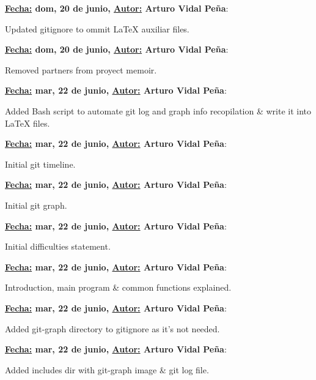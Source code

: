 \item \textbf{\underline{Fecha:} dom, 20 de junio, \underline{Autor:} Arturo Vidal Peña}:\\\item[] Updated gitignore to ommit LaTeX auxiliar files.\\
\item \textbf{\underline{Fecha:} dom, 20 de junio, \underline{Autor:} Arturo Vidal Peña}:\\\item[] Removed partners from proyect memoir.\\
\item \textbf{\underline{Fecha:} mar, 22 de junio, \underline{Autor:} Arturo Vidal Peña}:\\\item[] Added Bash script to automate git log and graph info recopilation \& write it into LaTeX files.\\
\item \textbf{\underline{Fecha:} mar, 22 de junio, \underline{Autor:} Arturo Vidal Peña}:\\\item[] Initial git timeline.\\
\item \textbf{\underline{Fecha:} mar, 22 de junio, \underline{Autor:} Arturo Vidal Peña}:\\\item[] Initial git graph.\\
\item \textbf{\underline{Fecha:} mar, 22 de junio, \underline{Autor:} Arturo Vidal Peña}:\\\item[] Initial difficulties statement.\\
\item \textbf{\underline{Fecha:} mar, 22 de junio, \underline{Autor:} Arturo Vidal Peña}:\\\item[] Introduction, main program \& common functions explained.\\
\item \textbf{\underline{Fecha:} mar, 22 de junio, \underline{Autor:} Arturo Vidal Peña}:\\\item[] Added git-graph directory to gitignore as it's not needed.\\
\item \textbf{\underline{Fecha:} mar, 22 de junio, \underline{Autor:} Arturo Vidal Peña}:\\\item[] Added includes dir with git-graph image \& git log file.\\
